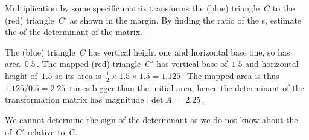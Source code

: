 \begin{example} 
Multiplication by some specific matrix transforms the (blue) triangle~\(C\) to the (red) triangle~\(C'\) as shown in the margin.  By finding the ratio of the s, estimate the  of the determinant of the matrix.
\begin{solution} 
The (blue) triangle~\(C\) has vertical height one and horizontal base one, so has area~\(0.5\)\,.
The mapped (red) triangle~\(C'\) has vertical base of~\(1.5\) and horizontal height of~\(1.5\) so its area is~\(\frac12\times1.5\times1.5=1.125\)\,.
The mapped area is thus \(1.125/0.5=2.25\)~times bigger than the initial area; hence the determinant of the transformation matrix has magnitude \(|\det A|=2.25\)\,.

We cannot determine the sign of the determinant as we do not know about the  of~\(C'\) relative to~\(C\).
\end{solution}
\end{example}



